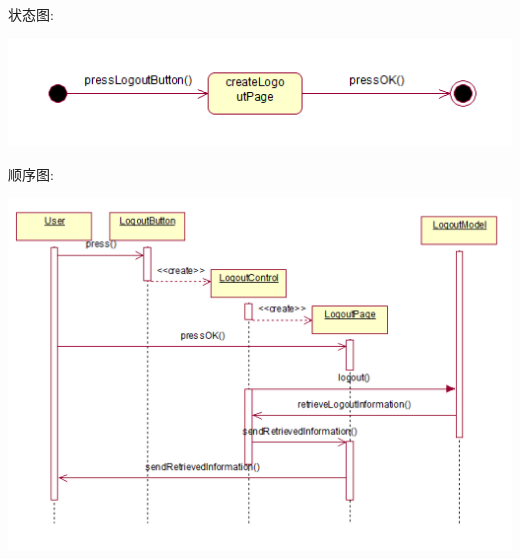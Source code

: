 \documentclass[11pt]{article}
\begin{document}
			状态图: 
			\begin{center}
			\includegraphics[scale=0.42]{登出_状态图.png}
			\end{center}

			顺序图: 
			\begin{center}
			\includegraphics[scale=0.42]{登出_顺序图.png}
			\end{center}
			
\end{document}
